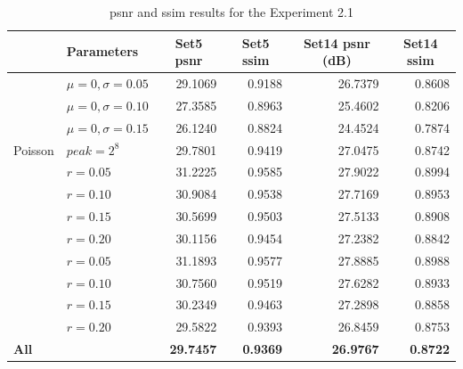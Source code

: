 \begin{table}[]
	\centering
	\begin{tabular}{|l|l|r|r|r|r|}
		\hline
		\rowcolor[HTML]{EFEFEF} 
		\multicolumn{1}{|c|}{\cellcolor[HTML]{EFEFEF}\textbf{Noise}} & \textbf{Parameters} & \multicolumn{1}{c|}{\cellcolor[HTML]{EFEFEF}\textbf{Set5 \gls{psnr}}} & \multicolumn{1}{c|}{\cellcolor[HTML]{EFEFEF}\textbf{Set5 \gls{ssim}}} & \multicolumn{1}{c|}{\cellcolor[HTML]{EFEFEF}\textbf{Set14 \gls{psnr} (dB)}} & \multicolumn{1}{c|}{\cellcolor[HTML]{EFEFEF}\textbf{Set14 \gls{ssim}}} \\ \hline
		\rowcolor[HTML]{FFFFFF} 
		\cellcolor[HTML]{EFEFEF} & $\mu=0, \sigma=0.05$ & 29.1069 & 0.9188 & 26.7379 & 0.8608 \\
		\rowcolor[HTML]{EFEFEF} 
		\cellcolor[HTML]{EFEFEF} & $\mu=0, \sigma=0.10$ & 27.3585 & 0.8963 & 25.4602 & 0.8206 \\
		\rowcolor[HTML]{FFFFFF} 
		\multirow{-3}{*}{\cellcolor[HTML]{EFEFEF}Gaussian} & $\mu=0, \sigma=0.15$ & 26.1240 & 0.8824 & 24.4524 & 0.7874 \\
		\rowcolor[HTML]{EFEFEF} 
		Poisson & $peak=2^8$ & 29.7801 & 0.9419 & 27.0475 & 0.8742 \\
		\rowcolor[HTML]{FFFFFF} 
		\cellcolor[HTML]{EFEFEF} & $r=0.05$ & 31.2225 & 0.9585 & 27.9022 & 0.8994 \\
		\rowcolor[HTML]{EFEFEF} 
		\cellcolor[HTML]{EFEFEF} & $r=0.10$ & 30.9084 & 0.9538 & 27.7169 & 0.8953 \\
		\rowcolor[HTML]{FFFFFF} 
		\cellcolor[HTML]{EFEFEF} & $r=0.15$ & 30.5699 & 0.9503 & 27.5133 & 0.8908 \\
		\rowcolor[HTML]{EFEFEF} 
		\multirow{-4}{*}{\cellcolor[HTML]{EFEFEF}Salt-and-pepper} & $r=0.20$ & 30.1156 & 0.9454 & 27.2382 & 0.8842 \\
		\rowcolor[HTML]{FFFFFF} 
		\cellcolor[HTML]{EFEFEF} & $r=0.05$ & 31.1893 & 0.9577 & 27.8885 & 0.8988 \\
		\rowcolor[HTML]{EFEFEF} 
		\cellcolor[HTML]{EFEFEF} & $r=0.10$ & 30.7560 & 0.9519 & 27.6282 & 0.8933 \\
		\rowcolor[HTML]{FFFFFF} 
		\cellcolor[HTML]{EFEFEF} & $r=0.15$ & 30.2349 & 0.9463 & 27.2898 & 0.8858 \\
		\rowcolor[HTML]{EFEFEF} 
		\multirow{-4}{*}{\cellcolor[HTML]{EFEFEF}Uniform} & $r=0.20$ & 29.5822 & 0.9393 & 26.8459 & 0.8753 \\
		\rowcolor[HTML]{FFFFFF} 
		\textbf{All} &  & \textbf{29.7457} & \textbf{0.9369} & \textbf{26.9767} & \textbf{0.8722}\\\hline
	\end{tabular}
	\caption{\gls{psnr} and \gls{ssim} results for the Experiment 2.1}
	\label{tab:experiment21}
\end{table}

